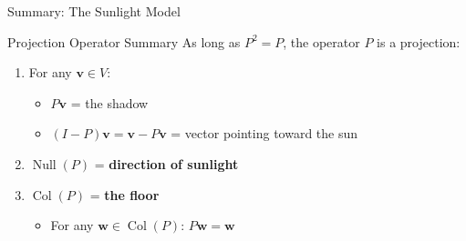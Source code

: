 \documentclass[10pt]{beamer}
\theoremstyle{definition}
\newcommand{\x}[1]{\alert{\textbf{#1}}}
\begin{document}
\begin{frame}{Summary: The Sunlight Model}

\begin{alertblock}{Projection Operator Summary}
As long as $P^2 = P$, the operator $P$ is a projection:

\begin{enumerate}
\item For any $\mathbf{v} \in V$:
\begin{itemize}
\item $P\mathbf{v}$ = the shadow
\item $(I - P)\mathbf{v} = \mathbf{v} - P\mathbf{v}$ = vector pointing toward the sun
\end{itemize}

\vspace{0.3em}

\item $\operatorname{Null}(P)$ = \x{direction of sunlight}

\vspace{0.3em}

\item $\operatorname{Col}(P)$ = \x{the floor}
\begin{itemize}
\item For any $\mathbf{w} \in \operatorname{Col}(P)$: $P\mathbf{w} = \mathbf{w}$
\end{itemize}
\end{enumerate}
\end{alertblock}

\end{frame}

\end{document}

